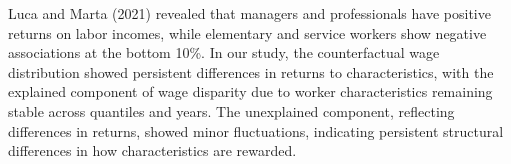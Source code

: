  Luca and Marta (2021) revealed that managers and professionals have positive returns on labor incomes, while elementary and service workers show negative associations at the bottom 10\%. In our study, the counterfactual wage distribution showed persistent differences in returns to characteristics, with the explained component of wage disparity due to worker characteristics remaining stable across quantiles and years. The unexplained component, reflecting differences in returns, showed minor fluctuations, indicating persistent structural differences in how characteristics are rewarded.